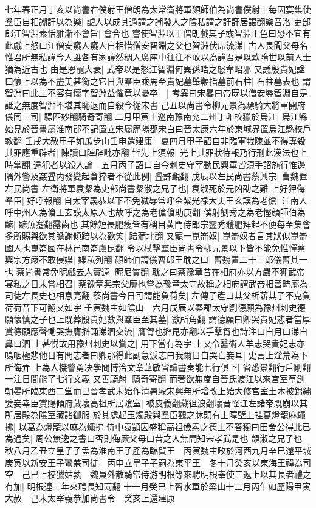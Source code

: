 七年春正月丁亥以尚書右僕射王僧朗為太常衛將軍顔師伯為尚書僕射上每因宴集使羣臣自相謿訐以為樂|{
	謔人以成其過謂之謿發人之隂私謂之訐訐居謁翻樂音洛}
吏部郎江智淵素恬雅漸不會旨|{
	會合也}
嘗使智淵以王僧朗戲其子彧智淵正色曰恐不宜有此戲上怒曰江僧安癡人癡人自相惜僧安智淵之父也智淵伏席流涕|{
	古人畏聞父母名惟君所無私諱今人雖各有家諱然稠人廣座中往往不敢以為諱吾是以歎隋世以前人士猶為近古也}
由是恩寵大衰|{
	武帝以是怒江智淵何異孫皓之怒韋昭邪}
又議殷貴妃諡曰懷上以為不盡美甚銜之它日與羣臣乘馬至貴妃墓舉鞭指墓前石柱|{
	石柱墓表也}
謂智淵曰此上不容有懷字智淵益懼竟以憂卒　|{
	考異曰宋畧曰帝既以僧安辱智淵自是詆之無度智淵不堪其恥退而自殺今從宋書}
己丑以尚書令柳元景為驃騎大將軍開府儀同三司|{
	驃匹妙翻騎奇寄翻}
二月甲寅上巡南豫南兖二州丁卯校獵於烏江|{
	烏江縣始見於晉書屬淮南郡不記置立宋屬歷陽郡宋白曰晉太康六年於東城界置烏江縣校戶教翻}
壬戌大赦甲子如瓜步山壬申還建康　夏四月甲子詔自非臨軍戰陳並不得專殺其罪應重辟者|{
	陳讀曰陣辟毗亦翻}
皆先上須報|{
	光上其罪狀待報乃行刑此漢法也上時掌翻}
違犯者以殺人論　五月丙子詔曰自今刺史守宰動民興軍皆須手詔施行惟邊隅外警及姦舋内發變起倉猝者不從此例|{
	舋許覲翻}
戊辰以左民尚書蔡興宗|{
	曹魏置左民尚書}
左衛將軍袁粲為吏部尚書粲淑之兄子也|{
	袁淑死於元凶劭之難}
上好狎侮羣臣|{
	好呼報翻}
自太宰義恭以下不免穢辱常呼金紫光禄大夫王玄謨為老傖|{
	江南人呼中州人為傖王玄謨太原人也故呼之為老傖傖助庚翻}
僕射劉秀之為老慳顔師伯為齴|{
	齴魚蹇翻露齒也}
其餘短長肥瘦皆有稱目黄門侍郎宗靈秀體肥拜起不便每至集會多所賜與欲其瞻謝傾踣以為歡笑|{
	踣蒲北翻}
又寵一崑崙奴|{
	崑崙奴者言其狀似崑崙國人也崑崙國在林邑南崙盧昆翻}
令以杖擊羣臣尚書令柳元景以下皆不能免惟憚蔡興宗方嚴不敢侵媟|{
	媟私列翻}
顔師伯謂儀曹郎王耽之曰|{
	曹魏置二十三郎儀曹其一也}
蔡尚書常免昵戲去人實遠|{
	昵尼質翻}
耽之曰蔡豫章昔在相府亦以方嚴不狎武帝宴私之日未嘗相召|{
	蔡豫章興宗父廓也嘗為豫章太守故稱之相府謂武帝相晉時廓為司徒左長史也相息亮翻}
蔡尚書今日可謂能負荷矣|{
	左傳子產曰其父析薪其子不克負荷荷音下可翻又如字}
壬寅魏主如隂山　六月戊辰以秦郡太守劉德願為豫州刺史德願懷慎之子也上既葬殷貴妃數與羣臣至其墓|{
	數所角翻}
謂德願曰卿哭貴妃悲者當厚賞德願應聲慟哭撫膺擗踊涕泗交流|{
	膺胷也擗毘亦翻以手擊胷也詩注曰自月曰涕自鼻曰泗}
上甚悦故用豫州刺史以賞之|{
	用下當有為字}
上又令醫術人羊志哭貴妃志亦嗚咽極悲他日有問志者曰卿那得此副急淚志曰我爾日自哭亡妾耳|{
	史言上淫荒為下所侮弄}
上為人機警勇决學問博洽文章華敏省讀書奏能七行俱下|{
	省悉景翻行戶剛翻一注日間能了七行文義}
又善騎射|{
	騎奇寄翻}
而奢欲無度自晉氏渡江以來宮室草創朝晏所臨東西二堂而已晉孝武末始作清暑殿宋興無所增改上始大修宫室土木被錦繡嬖妾幸臣賞賜傾府藏壞高祖所居隂室|{
	被皮義翻藏徂浪翻壞音怪江左諸帝既崩以其所居殿為隂室藏諸御服}
於其處起玉燭殿與羣臣觀之牀頭有土障壁上挂葛燈籠麻蠅拂|{
	以葛為燈籠以麻為蠅拂}
侍中袁顗因盛稱高祖儉素之德上不答獨曰田舍公得此已為過矣|{
	周公無逸之書曰否則侮厥父母曰昔之人無間知宋孝武是也}
顗淑之兄子也　秋八月乙丑立皇子子孟為淮南王子產為臨賀王　丙寅魏主畋於河西九月辛巳還平城　庚寅以新安王子鸞兼司徒　丙申立皇子子嗣為東平王　冬十月癸亥以東海王禕為司空　己巳上校獵姑孰　魏員外散騎常侍游明根等來聘明根奉使三返上以其長者禮之有加|{
	明根連三年來聘長知兩翻}
十一月癸巳上習水軍於梁山十二月丙午如歷陽甲寅大赦　己未太宰義恭加尚書令　癸亥上還建康

